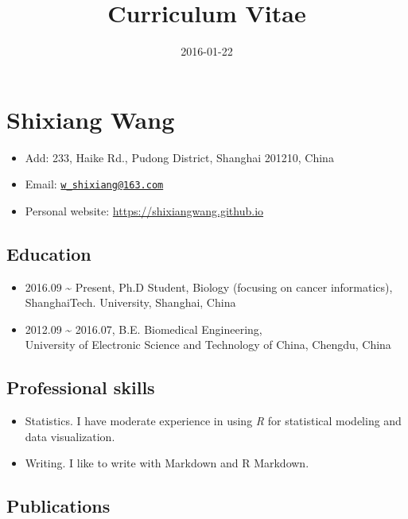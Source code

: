 \documentclass[10pt,]{article}
\title{Curriculum Vitae}
\date{2016-01-22}
\providecommand{\tightlist}{%
  \setlength{\itemsep}{0pt}\setlength{\parskip}{0pt}}
\begin{document}

\hypertarget{shixiang-wang}{%
\section{Shixiang Wang}\label{shixiang-wang}}

\begin{itemize}
\tightlist
\item
  Add: 233, Haike Rd., Pudong District, Shanghai 201210, China
\item
  Email:
  \href{mailto:w_shixiang@163.com}{\nolinkurl{w\_shixiang@163.com}}
\item
  Personal website: \url{https://shixiangwang.github.io}
\end{itemize}

\hypertarget{education}{%
\subsection{Education}\label{education}}

\begin{itemize}
\item
  2016.09 \textasciitilde{} Present, Ph.D Student, Biology (focusing on
  cancer informatics), \\
  ShanghaiTech. University, Shanghai, China
\item
  2012.09 \textasciitilde{} 2016.07, B.E. Biomedical Engineering, \\
  University of Electronic Science and Technology of China, Chengdu,
  China
\end{itemize}

\hypertarget{professional-skills}{%
\subsection{Professional skills}\label{professional-skills}}

\begin{itemize}
\item
  Statistics. I have moderate experience in using \emph{R} for
  statistical modeling and data visualization.
\item
  Writing. I like to write with Markdown and R Markdown.
\end{itemize}

\hypertarget{publications}{%
\subsection{Publications}\label{publications}}
\end{document}
